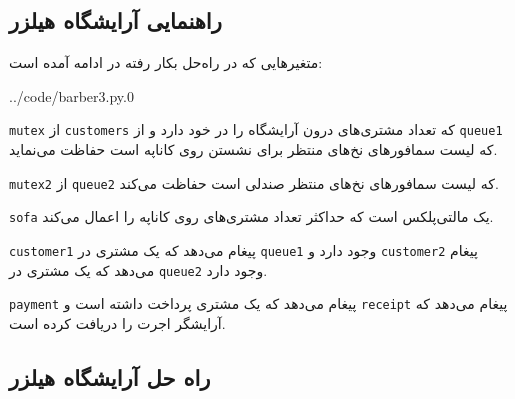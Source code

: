 \documentclass{book}
\newcommand{\clearemptydoublepage}{\newpage\cleardoublepage}
\begin{document}
\subsection{راهنمایی آرایشگاه هیلزر}

    متغیرهایی که در راه‌حل بکار رفته در ادامه آمده است:‌

\begin{latin}
%

{../code/barber3.py.0}
\end{latin}

    {\tt mutex}
    از {\tt customers} که تعداد مشتری‌های درون آرایشگاه را در خود دارد و  از {\tt queue1} که لیست سمافورهای نخ‌های منتظر برای نشستن 
    روی کاناپه است حفاظت می‌نماید. 

    {\tt mutex2} 
    از {\tt queue2} که لیست سمافورهای نخ‌های منتظر صندلی است حفاظت می‌کند. 


    {\tt sofa} 
    یک مالتی‌پلکس است که حداکثر تعداد مشتری‌های روی کاناپه را اعمال می‌کند. 

    {\tt customer1}
    پیغام می‌دهد که یک مشتری در  {\tt queue1} وجود دارد و {\tt customer2} پیغام می‌دهد که یک مشتری در  {\tt queue2} وجود دارد. 


     {\tt payment}
    پیغام می‌دهد که یک مشتری پرداخت داشته است و {\tt receipt} پیغام می‌دهد که آرایشگر اجرت را دریافت کرده است. 


\clearemptydoublepage
\subsection {راه حل آرایشگاه هیلزر}
\end{document}
